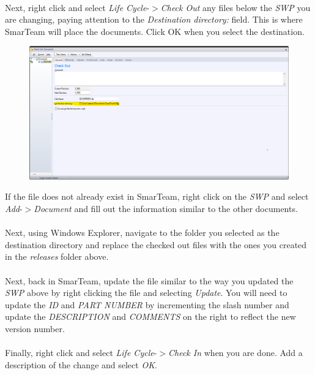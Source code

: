 \documentclass[10pt]{article}
\begin{document}
                \paragraph{}Next, right click and select \emph{Life Cycle}-$>$\emph{Check Out} any files below the \emph{SWP} you are changing, paying attention to the \emph{Destination directory:} field. This is where SmarTeam will place the documents. Click OK when you select the destination.
                \begin{figure}[H]
                    \centerline{\includegraphics[width=\textwidth]{References/ST Check Out Window.png}}
                \end{figure}
                If the file does not already exist in SmarTeam, right click on the \emph{SWP} and select \emph{Add}-$>$\emph{Document} and fill out the information similar to the other documents.
                \paragraph{}Next, using Windows Explorer, navigate to the folder you selected as the destination directory and replace the checked out files with the ones you created in the \emph{releases} folder above.
                \paragraph{}Next, back in SmarTeam, update the file similar to the way you updated the \emph{SWP} above by right clicking the file and selecting \emph{Update}. You will need to update the \emph{ID} and \emph{PART NUMBER} by incrementing the slash number and update the \emph{DESCRIPTION} and \emph{COMMENTS} on the right to reflect the new version number.
                \paragraph{}Finally, right click and select \emph{Life Cycle}-$>$\emph{Check In} when you are done. Add a description of the change and select \emph{OK}.
\end{document}
